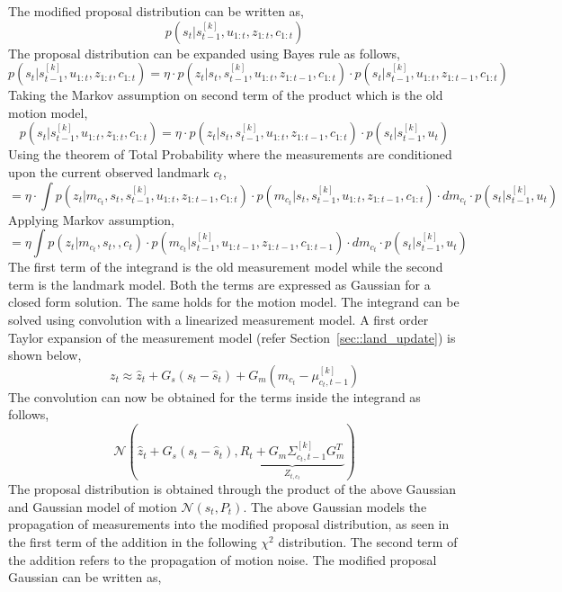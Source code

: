 The modified proposal distribution can be written as,
\begin{equation}
p(s_t|s^{[k]}_{t-1},u_{1:t},z_{1:t},c_{1:t})
\end{equation}
The proposal distribution can be expanded using Bayes rule as follows,
\begin{equation}
p(s_t|s^{[k]}_{t-1},u_{1:t},z_{1:t},c_{1:t}) = \eta\cdot p(z_t|s_t,s^{[k]}_{t-1},u_{1:t},z_{1:t-1},c_{1:t})\cdot p(s_t|s^{[k]}_{t-1},u_{1:t},z_{1:t-1},c_{1:t})
\end{equation}
Taking the Markov assumption on second term of the product which is the old motion model,
\begin{equation}
p(s_t|s^{[k]}_{t-1},u_{1:t},z_{1:t},c_{1:t}) = \eta\cdot p(z_t|s_t,s^{[k]}_{t-1},u_{1:t},z_{1:t-1},c_{1:t})\cdot p(s_t|s^{[k]}_{t-1},u_t)
\end{equation} 
Using the theorem of Total Probability where the measurements are conditioned upon the current observed landmark $c_t$,
\begin{equation}
= \eta\cdot \int p(z_t|m_{c_t},s_t,s^{[k]}_{t-1},u_{1:t},z_{1:t-1},c_{1:t})\cdot p(m_{c_t}|s_t,s^{[k]}_{t-1},u_{1:t},z_{1:t-1},c_{1:t})\cdot dm_{c_t}\cdot p(s_t|s^{[k]}_{t-1},u_t)
\end{equation}
Applying Markov assumption,
\begin{equation}
= \eta\int p(z_t|m_{c_t},s_t,,c_t)\cdot p(m_{c_t}|s^{[k]}_{t-1},u_{1:t-1},z_{1:t-1},c_{1:t-1})\cdot dm_{c_t}\cdot p(s_t|s^{[k]}_{t-1},u_t)
\end{equation}
The first term of the integrand is the old measurement model while the second term is the landmark model. Both the terms are expressed as Gaussian for a closed form solution. The same holds for the motion model. The integrand can be solved using convolution with a linearized measurement model. A first order Taylor expansion of the measurement model (refer Section~\ref{sec::land_update}) is shown below,
\begin{equation}
z_t\approx \hat{z}_t+G_s\left(s_t-\hat{s}_t\right)+G_{m}\left(m_{c_t}-\mu^{[k]}_{c_t,t-1}\right)
\end{equation}
The convolution can now be obtained for the terms inside the integrand as follows,
\begin{equation}
\mathcal{N}\left(\hat{z}_t+G_s\left(s_t-\hat{s}_t\right),\underbrace{R_t+G_{m}\Sigma^{[k]}_{c_t,t-1}G^T_{m}}_{Z_{t,c_t}}\right)
\end{equation}
The proposal distribution is obtained through the product of the above Gaussian and Gaussian model of motion $\mathcal{N}\left(\hat{s}_t,P_t\right)$. The above Gaussian models the propagation of measurements into the modified proposal distribution, as seen in the first term of the addition in the following $\chi^2$ distribution. The second term of the addition refers to the propagation of motion noise. The modified proposal Gaussian can be written as,
